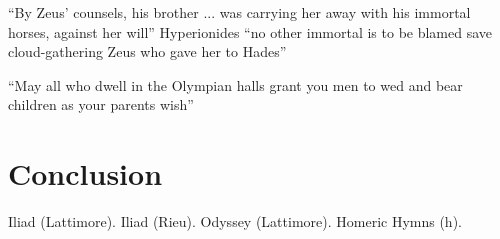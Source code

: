 \documentclass[11pt]{article}
\begin{document}

``By Zeus' counsels, his brother ... was carrying her away with his immortal horses, against her will''\cite[line 30]{persephone}
Hyperionides ``no other immortal is to be blamed save cloud-gathering Zeus who gave her to Hades'' \cite[line 78]{persephone}

``May all who dwell in the Olympian halls grant you men to wed and bear children as your parents wish'' \cite[line 136]{persephone}




\section{Conclusion}


\newpage

\begin{thebibliography}{9}
		Iliad (Lattimore).
		Iliad (Rieu).
		Odyssey (Lattimore).
		Homeric Hymns (h).
\end{thebibliography}
\end{document}

